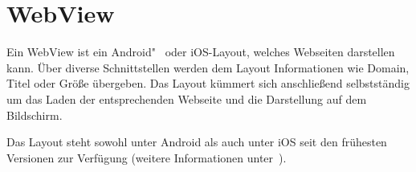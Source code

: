 \section{WebView}
Ein WebView ist ein Android"~ oder iOS-Layout, welches Webseiten darstellen kann. Über diverse Schnittstellen werden dem
Layout Informationen wie Domain, Titel oder Größe übergeben. Das Layout kümmert sich anschließend selbstständig um das
Laden der entsprechenden Webseite und die Darstellung auf dem Bildschirm.

Das Layout steht sowohl unter Android als auch unter iOS seit den frühesten Versionen zur Verfügung (weitere
Informationen unter~\cite{online_grundlagen_webview}).